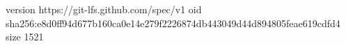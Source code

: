version https://git-lfs.github.com/spec/v1
oid sha256:e8d0ff94d677b160ca0e14e279f2226874db443049d44d894805feae619cdfd4
size 1521
